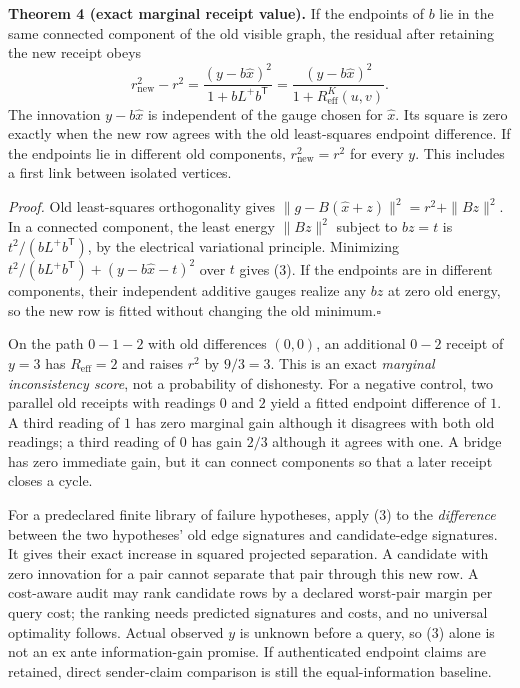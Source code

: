 \documentclass[11pt,a4paper]{article}
\begin{document}
\begin{thebox}
\textbf{Theorem 4 (exact marginal receipt value).} If the endpoints of $b$ lie in the same connected component of
the old visible graph, the residual after retaining the new receipt obeys
\[
r_{\mathrm{new}}^2-r^2
=\frac{(y-b\hat x)^2}{1+bL^+b^\mathsf{T}}
=\frac{(y-b\hat x)^2}{1+R_{\mathrm{eff}}^K(u,v)}.\tag{3}\label{eq:receipt-gain}
\]
The innovation $y-b\hat x$ is independent of the gauge chosen for $\hat x$. Its square is zero exactly when the
new row agrees with the old least-squares endpoint difference. If the endpoints lie in different old components,
$r_{\mathrm{new}}^2=r^2$ for every $y$. This includes a first link between isolated vertices.

\emph{Proof.} Old least-squares orthogonality gives
$\|g-B(\hat x+z)\|^2=r^2+\|Bz\|^2$. In a connected component, the least energy $\|Bz\|^2$
subject to $bz=t$ is $t^2/(bL^+b^\mathsf{T})$, by the electrical variational principle. Minimizing
$t^2/(bL^+b^\mathsf{T})+(y-b\hat x-t)^2$ over $t$ gives (3). If the endpoints are in different components,
their independent additive gauges realize any $bz$ at zero old energy, so the new row is fitted without
changing the old minimum.\hfill$\square$
\end{thebox}

On the path $0\! -\!1\! -\!2$ with old differences $(0,0)$, an additional $0\! -\!2$ receipt of $y=3$
has $R_{\mathrm{eff}}=2$ and raises $r^2$ by $9/3=3$. This is an exact \emph{marginal inconsistency score},
not a probability of dishonesty. For a negative control, two parallel old receipts with readings $0$ and
$2$ yield a fitted endpoint difference of $1$. A third reading of $1$ has zero marginal gain although it
disagrees with both old readings; a third reading of $0$ has gain $2/3$ although it agrees with one. A bridge
has zero immediate gain, but it can connect components so that a later receipt closes a cycle.

For a predeclared finite library of failure hypotheses, apply (3) to the \emph{difference} between the two
hypotheses' old edge signatures and candidate-edge signatures. It gives their exact increase in squared projected
separation. A candidate with zero innovation for a pair cannot separate that pair through this new row. A
cost-aware audit may rank candidate rows by a declared worst-pair margin per query cost; the ranking needs
predicted signatures and costs, and no universal optimality follows. Actual observed $y$ is unknown before a
query, so (3) alone is not an ex ante information-gain promise. If authenticated endpoint claims are retained,
direct sender-claim comparison is still the equal-information baseline.
\end{document}
